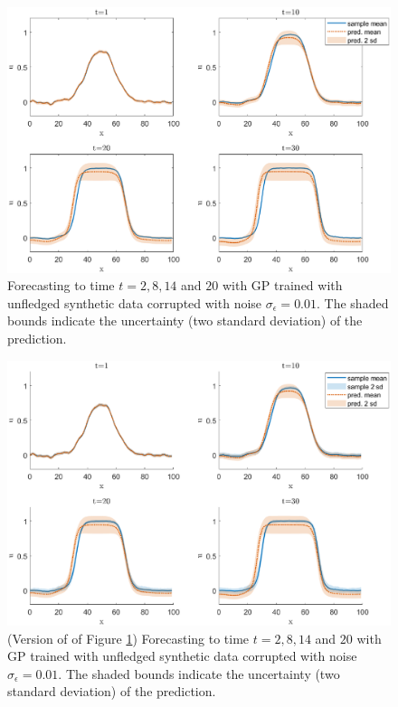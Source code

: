 \documentclass[smallextended,natbib]{svjour3}       %
\begin{document}
\begin{figure}[H]
\centerline{\includegraphics[width=\textwidth]{chapterGP/figures/bistable-noi-short}}
\caption{\label{fig:u subplot ic2} Forecasting to time $t=2,8,14$ and $20$ with GP trained with unfledged synthetic data corrupted with noise $\sigma_{\epsilon}=0.01$. The shaded bounds indicate the uncertainty (two standard deviation) of the prediction.}
\end{figure}

\begin{figure}[H]
\centerline{\includegraphics[width=\textwidth]{chapterGP/figures/bistable-noi-short2}}
\caption{\label{fig:u subplot ic2 v2} (Version of of Figure \ref{fig:u subplot ic2}) Forecasting to time $t=2,8,14$ and $20$ with GP trained with unfledged synthetic data corrupted with noise $\sigma_{\epsilon}=0.01$. The shaded bounds indicate the uncertainty (two standard deviation) of the prediction.}
\end{figure}
\end{document}
